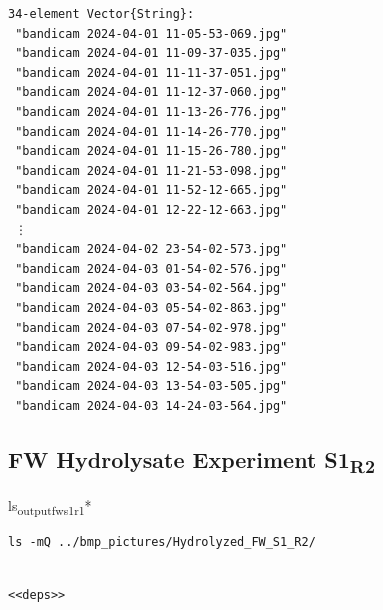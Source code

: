 \documentclass[11pt]{article}
\begin{document}
\begin{verbatim}
34-element Vector{String}:
 "bandicam 2024-04-01 11-05-53-069.jpg"
 "bandicam 2024-04-01 11-09-37-035.jpg"
 "bandicam 2024-04-01 11-11-37-051.jpg"
 "bandicam 2024-04-01 11-12-37-060.jpg"
 "bandicam 2024-04-01 11-13-26-776.jpg"
 "bandicam 2024-04-01 11-14-26-770.jpg"
 "bandicam 2024-04-01 11-15-26-780.jpg"
 "bandicam 2024-04-01 11-21-53-098.jpg"
 "bandicam 2024-04-01 11-52-12-665.jpg"
 "bandicam 2024-04-01 12-22-12-663.jpg"
 ⋮
 "bandicam 2024-04-02 23-54-02-573.jpg"
 "bandicam 2024-04-03 01-54-02-576.jpg"
 "bandicam 2024-04-03 03-54-02-564.jpg"
 "bandicam 2024-04-03 05-54-02-863.jpg"
 "bandicam 2024-04-03 07-54-02-978.jpg"
 "bandicam 2024-04-03 09-54-02-983.jpg"
 "bandicam 2024-04-03 12-54-03-516.jpg"
 "bandicam 2024-04-03 13-54-03-505.jpg"
 "bandicam 2024-04-03 14-24-03-564.jpg"
\end{verbatim}

\subsection{FW Hydrolysate Experiment S1\textsubscript{R2}}
\label{sec:org08287fa}
ls\textsubscript{output}\textsubscript{fw}\textsubscript{s1}\textsubscript{r1}*
\begin{verbatim}
ls -mQ ../bmp_pictures/Hydrolyzed_FW_S1_R2/
\end{verbatim}

\begin{verbatim}

<<deps>>

\end{verbatim}
\end{document}
